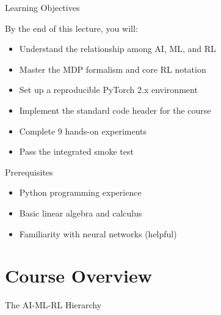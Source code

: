 \documentclass[aspectratio=169,10pt]{beamer}
\begin{document}
\begin{frame}{Learning Objectives}
\begin{block}{By the end of this lecture, you will:}
\begin{itemize}
    \item Understand the relationship among AI, ML, and RL
    \item Master the MDP formalism and core RL notation
    \item Set up a reproducible PyTorch 2.x environment
    \item Implement the standard code header for the course
    \item Complete 9 hands-on experiments
    \item Pass the integrated smoke test
\end{itemize}
\end{block}

\begin{alertblock}{Prerequisites}
\begin{itemize}
    \item Python programming experience
    \item Basic linear algebra and calculus
    \item Familiarity with neural networks (helpful)
\end{itemize}
\end{alertblock}
\end{frame}

\section{Course Overview}

\begin{frame}{The AI-ML-RL Hierarchy}
\begin{center}
\end{center}
\end{frame}
\end{document}
